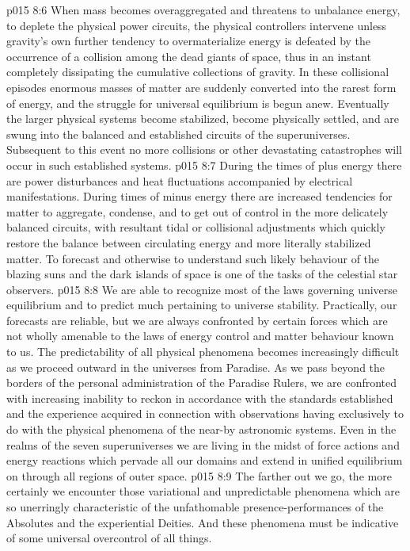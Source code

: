 \vs p015 8:6 When mass becomes overaggregated and threatens to unbalance energy, to deplete the physical power circuits, the physical controllers intervene unless gravity’s own further tendency to overmaterialize energy is defeated by the occurrence of a collision among the dead giants of space, thus in an instant completely dissipating the cumulative collections of gravity. In these collisional episodes enormous masses of matter are suddenly converted into the rarest form of energy, and the struggle for universal equilibrium is begun anew. Eventually the larger physical systems become stabilized, become physically settled, and are swung into the balanced and established circuits of the superuniverses. Subsequent to this event no more collisions or other devastating catastrophes will occur in such established systems.
\vs p015 8:7 During the times of plus energy there are power disturbances and heat fluctuations accompanied by electrical manifestations. During times of minus energy there are increased tendencies for matter to aggregate, condense, and to get out of control in the more delicately balanced circuits, with resultant tidal or collisional adjustments which quickly restore the balance between circulating energy and more literally stabilized matter. To forecast and otherwise to understand such likely behaviour of the blazing suns and the dark islands of space is one of the tasks of the celestial star observers.
\vs p015 8:8 We are able to recognize most of the laws governing universe equilibrium and to predict much pertaining to universe stability. Practically, our forecasts are reliable, but we are always confronted by certain forces which are not wholly amenable to the laws of energy control and matter behaviour known to us. The predictability of all physical phenomena becomes increasingly difficult as we proceed outward in the universes from Paradise. As we pass beyond the borders of the personal administration of the Paradise Rulers, we are confronted with increasing inability to reckon in accordance with the standards established and the experience acquired in connection with observations having exclusively to do with the physical phenomena of the near\hyp{}by astronomic systems. Even in the realms of the seven superuniverses we are living in the midst of force actions and energy reactions which pervade all our domains and extend in unified equilibrium on through all regions of outer space.
\vs p015 8:9 The farther out we go, the more certainly we encounter those variational and unpredictable phenomena which are so unerringly characteristic of the unfathomable presence\hyp{}performances of the Absolutes and the experiential Deities. And these phenomena must be indicative of some universal overcontrol of all things.
